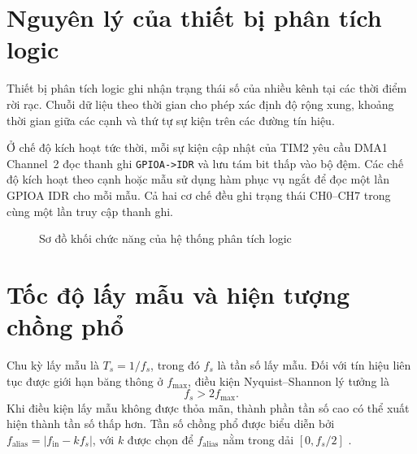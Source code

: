 \section{Nguyên lý của thiết bị phân tích logic}\label{sec:logic-analyzer}

Thiết bị phân tích logic ghi nhận trạng thái số của nhiều kênh tại các thời điểm rời rạc. Chuỗi dữ liệu theo thời gian cho phép xác định độ rộng xung, khoảng thời gian giữa các cạnh và thứ tự sự kiện trên các đường tín hiệu.

Ở chế độ kích hoạt tức thời, mỗi sự kiện cập nhật của TIM2 yêu cầu DMA1 Channel~2 đọc thanh ghi \texttt{GPIOA->IDR} và lưu tám bit thấp vào bộ đệm. Các chế độ kích hoạt theo cạnh hoặc mẫu sử dụng hàm phục vụ ngắt để đọc một lần GPIOA IDR cho mỗi mẫu. Cả hai cơ chế đều ghi trạng thái CH0--CH7 trong cùng một lần truy cập thanh ghi.

\begin{figure}[H]
\centering
{}
\caption{Sơ đồ khối chức năng của hệ thống phân tích logic}
\label{fig:logic-analyzer-block}
\end{figure}

\section{Tốc độ lấy mẫu và hiện tượng chồng phổ}\label{sec:nyquist-aliasing}

Chu kỳ lấy mẫu là \(T_s=1/f_s\), trong đó \(f_s\) là tần số lấy mẫu. Đối với tín hiệu liên tục được giới hạn băng thông ở \(f_{\max}\), điều kiện Nyquist--Shannon lý tưởng là
\[
f_s > 2f_{\max}.
\]
Khi điều kiện lấy mẫu không được thỏa mãn, thành phần tần số cao có thể xuất hiện thành tần số thấp hơn. Tần số chồng phổ được biểu diễn bởi \(f_{\mathrm{alias}}=|f_{\mathrm{in}}-k f_s|\), với \(k\) được chọn để \(f_{\mathrm{alias}}\) nằm trong dải \([0,f_s/2]\) \cite{shannon1949}.

